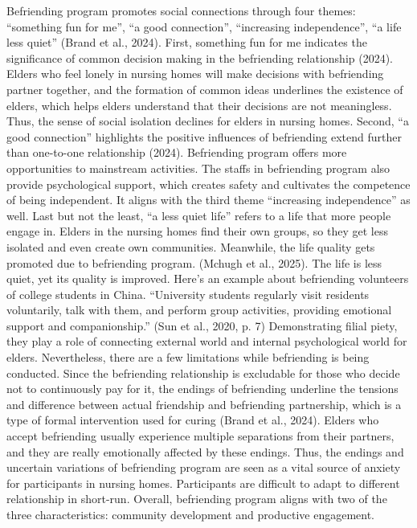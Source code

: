 \documentclass[12pt]{article}
\begin{document}
Befriending program promotes social connections through four themes: “something fun for me”, “a good connection”, “increasing independence”, “a life less quiet” (Brand et al., 2024). First, something fun for me indicates the significance of common decision making in the befriending relationship (2024). Elders who feel lonely in nursing homes will make decisions with befriending partner together, and the formation of common ideas underlines the existence of elders, which helps elders understand that their decisions are not meaningless. Thus, the sense of social isolation declines for elders in nursing homes. Second, “a good connection” highlights the positive influences of befriending extend further than one-to-one relationship (2024). Befriending program offers more opportunities to mainstream activities. The staffs in befriending program also provide psychological support, which creates safety and cultivates the competence of being independent. It aligns with the third theme “increasing independence” as well. Last but not the least, “a less quiet life” refers to a life that more people engage in. Elders in the nursing homes find their own groups, so they get less isolated and even create own communities. Meanwhile, the life quality gets promoted due to befriending program. (Mchugh et al., 2025). The life is less quiet, yet its quality is improved. Here’s an example about befriending volunteers of college students in China. “University students regularly visit residents voluntarily, talk with them, and perform group activities, providing emotional support and companionship.” (Sun et al., 2020, p. 7) Demonstrating filial piety, they play a role of connecting external world and internal psychological world for elders. Nevertheless, there are a few limitations while befriending is being conducted. Since the befriending relationship is excludable for those who decide not to continuously pay for it, the endings of befriending underline the tensions and difference between actual friendship and befriending partnership, which is a type of formal intervention used for curing (Brand et al., 2024). Elders who accept befriending usually experience multiple separations from their partners, and they are really emotionally affected by these endings. Thus, the endings and uncertain variations of befriending program are seen as a vital source of anxiety for participants in nursing homes. Participants are difficult to adapt to different relationship in short-run. Overall, befriending program aligns with two of the three characteristics: community development and productive engagement.
\end{document}
